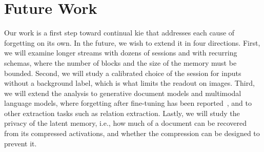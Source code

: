 \section{Future Work}
\label{sec:c7-s3}

Our work is a first step toward continual \gls{kie} that addresses each cause of forgetting
on its own. In the future, we wish to extend it in four directions. First, we will examine
longer streams with dozens of sessions and with recurring schemas, where the number of
blocks and the size of the memory must be bounded. Second, we will study a calibrated
choice of the session for inputs without a background label, which is what limits the
readout on images. Third, we will extend the analysis to generative document models and
multimodal language models, where forgetting after fine-tuning has been
reported~\citep{zhai2023investigating}, and to other extraction tasks such as relation
extraction. Lastly, we will study the privacy of the latent memory, i.e., how much of a
document can be recovered from its compressed activations, and whether the compression can
be designed to prevent it.
